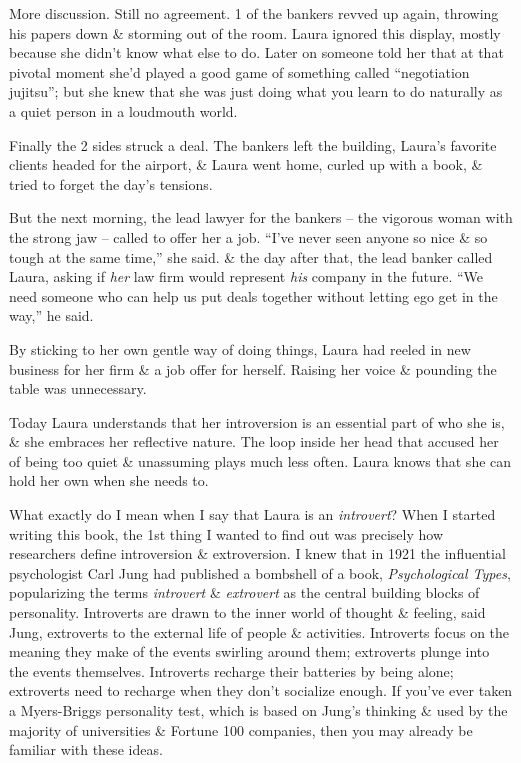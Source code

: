 \documentclass{article}
\numberwithin{equation}{section}
\begin{document}
More discussion. Still no agreement. 1 of the bankers revved up again, throwing his papers down \& storming out of the room. Laura ignored this display, mostly because she didn't know what else to do. Later on someone told her that at that pivotal moment she'd played a good game of something called ``negotiation jujitsu''; but she knew that she was just doing what you learn to do naturally as a quiet person in a loudmouth world.

Finally the 2 sides struck a deal. The bankers left the building, Laura's favorite clients headed for the airport, \& Laura went home, curled up with a book, \& tried to forget the day's tensions.

But the next morning, the lead lawyer for the bankers -- the vigorous woman with the strong jaw -- called to offer her a job. ``I've never seen anyone so nice \& so tough at the same time,'' she said. \& the day after that, the lead banker called Laura, asking if \textit{her}
law firm would represent \textit{his} company in the future. ``We need someone who can help us put deals together without letting ego get in the way,'' he said.

By sticking to her own gentle way of doing things, Laura had reeled in new business for her firm \& a job offer for herself. Raising her voice \& pounding the table was unnecessary.

Today Laura understands that her introversion is an essential part of who she is, \& she embraces her reflective nature. The loop inside her head that accused her of being too quiet \& unassuming plays much less often. Laura knows that she can hold her own when she needs to.

What exactly do I mean when I say that Laura is an \textit{introvert}? When I started writing this book, the 1st thing I wanted to find out was precisely how researchers define introversion \& extroversion. I knew that in 1921 the influential psychologist Carl Jung had published a bombshell of a book, \textit{Psychological Types}, popularizing the terms \textit{introvert} \& \textit{extrovert} as the central building blocks of personality. Introverts are drawn to the inner world of thought \& feeling, said Jung, extroverts to the external life of people \& activities. Introverts focus on the meaning they make of the events swirling around them; extroverts plunge into the events themselves. Introverts recharge their batteries by being alone; extroverts need to recharge when they don't socialize enough. If you've ever taken a Myers-Briggs personality test, which is based on Jung's thinking \& used by the majority of universities \& Fortune 100 companies, then you may already be familiar with these ideas.
\end{document}
